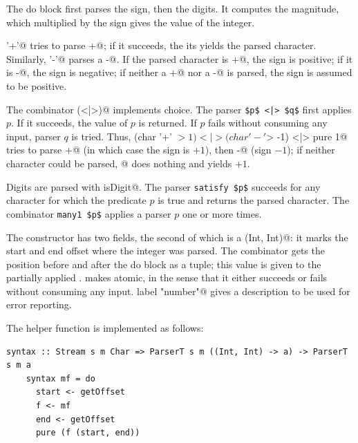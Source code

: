 \documentclass[UdineBachThesis,american,11pt]{PhdThesis}
\begin{document}
  The do block first parses the sign, then the digits. It computes the
  magnitude, which multiplied by the sign gives the value of the integer.

  \lstinline@char '+'@ tries to parse \lstinline@+@; if it succeeds, the its
  yields the parsed character. Similarly, \lstinline@char '-'@ parses a
  \lstinline@-@. If the parsed character is \lstinline@+@, the sign is positive;
  if it is \lstinline@-@, the sign is negative; if neither a \lstinline@+@ nor a
  \lstinline@-@ is parsed, the sign is assumed to be positive.

  The combinator \lstinline@(<|>)@ implements choice. The parser
  \lstinline[mathescape]@$p$ <|> $q$@ first applies $p$. If it succeeds, the
  value of $p$ is returned. If $p$ fails without consuming any input, parser $q$
  is tried. Thus, \lstinline@(char '+' $> 1) <|> (char '-' $> -1) <|> pure 1@
  tries to parse \lstinline@+@ (in which case the sign is $+1$), then
  \lstinline@-@ (sign $-1$); if neither character could be parsed,
  @ does nothing and yields $+1$.

  \pagebreak

  Digits are parsed with \lstinline@satisfy isDigit@. The parser
  \lstinline[mathescape]@satisfy $p$@ succeeds for any character for which the
  predicate $p$ is true and returns the parsed character. The combinator
  \lstinline[mathescape]@many1 $p$@ applies a parser $p$ one or more times.

  The constructor \lstinline@IntegerExpression@ has two fields, the second of
  which is a \lstinline@(Int, Int)@: it marks the start and end offset where the
  integer was parsed. The \lstinline@syntax@ combinator gets the position before
  and after the do block as a tuple; this value is given to the partially
  applied \lstinline@IntegerExpression@. \lstinline@try@ makes
  \lstinline@integerExpression@ atomic, in the sense that it either succeeds or
  fails without consuming any input. \lstinline@flip label "number"@ gives a
  description to be used for error reporting.

  The helper function \lstinline@syntax@ is implemented as follows:

  \begin{lstlisting}[gobble=4,basicstyle=\ttfamily\small]
    syntax :: Stream s m Char => ParserT s m ((Int, Int) -> a) -> ParserT s m a
    syntax mf = do
      start <- getOffset
      f <- mf
      end <- getOffset
      pure (f (start, end))
  \end{lstlisting}
\end{document}
